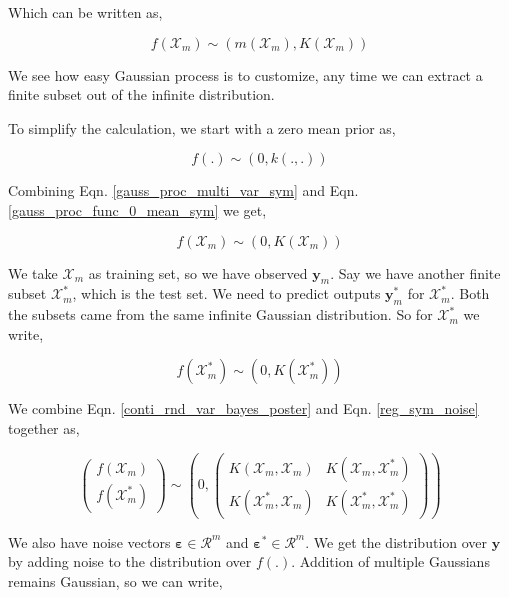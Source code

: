 \documentclass[english]{tktltiki}
\begin{document}
Which can be written as,

\begin{equation}
f(\mathcal{X}_m) \sim (m(\mathcal{X}_m), K(\mathcal{X}_m))
\label{gauss_proc_multi_var_sym}
\end{equation}

We see how easy Gaussian process is to customize, any time we can extract a finite subset out of the infinite distribution.

To simplify the calculation, we start with a zero mean prior as,

\begin{equation}
f(.) \sim (0, k(.,.))
\label{gauss_proc_func_0_mean_sym}
\end{equation}

Combining Eqn. \ref{gauss_proc_multi_var_sym} and Eqn. \ref{gauss_proc_func_0_mean_sym} we get,

\begin{equation}
f(\mathcal{X}_m) \sim (0, K(\mathcal{X}_m))
\end{equation}

We take $\mathcal{X}_m$ as training set, so we have observed $\mathbf{y}_m$. Say we have another finite subset $\mathcal{X}_m^*$, which is the test set. We need to predict outputs $\mathbf{y}_m^*$ for $\mathcal{X}_m^*$. Both the subsets came from the same infinite Gaussian distribution. So for $\mathcal{X}_m^*$ we write,

\begin{equation}
f(\mathcal{X}_m^*) \sim (0, K(\mathcal{X}_m^*))
\end{equation}

We combine Eqn. \ref{conti_rnd_var_bayes_poster} and Eqn. \ref{reg_sym_noise} together as,

\begin{equation}
\begin{pmatrix}
f(\mathcal{X}_m) \\
f(\mathcal{X}_m^*)
\end{pmatrix}
\sim \left( %
0, %
\begin{pmatrix}
K(\mathcal{X}_m, \mathcal{X}_m) & K(\mathcal{X}_m, \mathcal{X}_m^*) \\
K(\mathcal{X}_m^*, \mathcal{X}_m) & K(\mathcal{X}_m^*, \mathcal{X}_m^*)
\end{pmatrix}\right)
\end{equation}

We also have noise vectors $\mathbf{\varepsilon} \in \mathcal{R}^m$ and $\mathbf{\varepsilon^*} \in \mathcal{R}^m$. We get the distribution over $\mathbf{y}$ by adding noise to the distribution over $f(.)$. Addition of multiple Gaussians remains Gaussian, so we can write,
\end{document}
